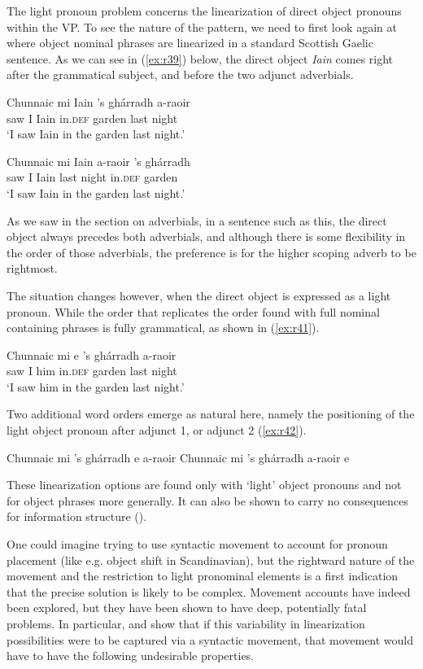 \documentclass[output=paper,colorlinks,citecolor=brown]{langscibook}
\begin{document}
The light pronoun problem concerns the linearization of direct object pronouns within the VP.   To see the nature of the pattern, we need to first look again at where object nominal phrases are linearized in a standard Scottish Gaelic sentence. As we can see in (\ref{ex:r39}) below, the direct object \textit{Iain} comes right after the grammatical subject, and before the two adjunct adverbials.

\ea\label{ex:r39}
\gll Chunnaic mi Iain 's gh\'{a}rradh {a-raoir} \\
saw I Iain in.\textsc{def} garden {last night} \\
\glt `I saw Iain in the garden last night.'
\z

\ea\label{ex:r40}
\gll Chunnaic mi Iain  {a-raoir} 's gh\'{a}rradh \\
saw I Iain {last night}  in.\textsc{def} garden  \\
\glt `I saw Iain in the garden last night.'
\z

As we saw in the section on adverbials, in a sentence such as this, the direct object always precedes both adverbials, and although there is some flexibility in the order of those adverbials, the preference is for the higher scoping adverb to be rightmost. 


The situation changes however, when the direct object is expressed as a light pronoun. While the order that replicates the order found with full nominal containing phrases is fully grammatical,  as shown in (\ref{ex:r41}). 

\ea\label{ex:r41}
\gll Chunnaic mi e 's gh\'{a}rradh {a-raoir} \\
saw I him in.\textsc{def} garden {last night} \\
\glt `I saw him in the garden last night.'
\z

Two additional word orders emerge as natural here, namely the positioning of the light object pronoun after adjunct 1, or adjunct 2 (\ref{ex:r42}). 

\ea\label{ex:r42}
\ea Chunnaic mi 's gh\'{a}rradh e a-raoir
\ex Chunnaic mi 's gh\'{a}rradh a-raoir e 
\z
\z

These linearization options are found only with `light' object pronouns and not for object phrases more generally. It can also be shown to carry no consequences for information structure (\citealt{bennettelfnermccloskey13}). 

One could imagine trying to use syntactic movement to account for pronoun placement (like e.g. object shift in Scandinavian), but the rightward nature of the movement and the restriction to light pronominal elements is a first  indication that the precise solution is likely to be  complex.  Movement accounts have indeed been explored, but they have been  shown to have deep, potentially fatal problems. In particular, 
\citet{bennettelfnermccloskey13} and \citet{adger07pronouns} show that if this variability in linearization possibilities were to be captured via a syntactic movement, that movement would have to have the following undesirable properties.
\end{document}
